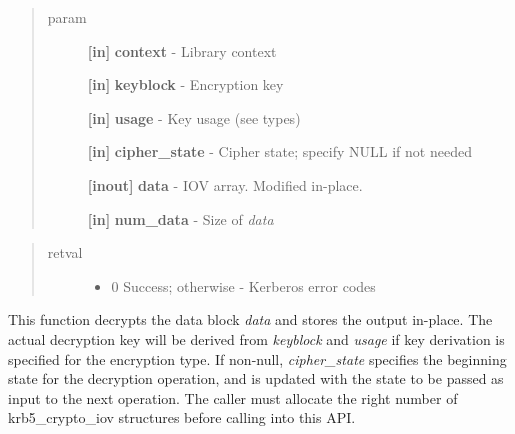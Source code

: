 \documentclass[letterpaper,10pt,english]{sphinxmanual}
\begin{document}
\begin{fulllineitems}
\label{appdev/refs/api/krb5_c_decrypt_iov:c.krb5_c_decrypt_iov}
\end{fulllineitems}

\begin{quote}\begin{description}
\item[{param}] \leavevmode
\textbf{{[}in{]}} \textbf{context} - Library context

\textbf{{[}in{]}} \textbf{keyblock} - Encryption key

\textbf{{[}in{]}} \textbf{usage} - Key usage (see  types)

\textbf{{[}in{]}} \textbf{cipher\_state} - Cipher state; specify NULL if not needed

\textbf{{[}inout{]}} \textbf{data} - IOV array. Modified in-place.

\textbf{{[}in{]}} \textbf{num\_data} - Size of \emph{data}

\end{description}\end{quote}
\begin{quote}\begin{description}
\item[{retval}] \leavevmode\begin{itemize}
\item {} 
0   Success; otherwise - Kerberos error codes

\end{itemize}

\end{description}\end{quote}

This function decrypts the data block \emph{data} and stores the output in-place. The actual decryption key will be derived from \emph{keyblock} and \emph{usage} if key derivation is specified for the encryption type. If non-null, \emph{cipher\_state} specifies the beginning state for the decryption operation, and is updated with the state to be passed as input to the next operation. The caller must allocate the right number of krb5\_crypto\_iov structures before calling into this API.
\end{document}
